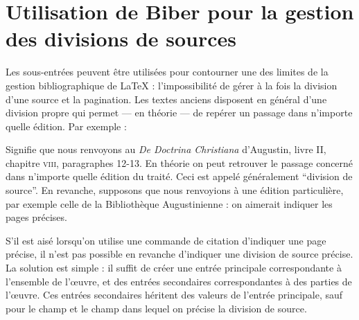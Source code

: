 \section[Division des sources antiques]{Utilisation de Biber pour la gestion des divisions de sources}\label{divisionsource}

Les sous-entrées peuvent être utilisées pour contourner une des limites de la gestion bibliographique de \LaTeX{} : l'impossibilité de gérer à la fois  la division d'une source et la pagination. Les textes anciens disposent en général d'une division propre qui permet --- en théorie ---  de repérer un passage dans n'importe quelle édition. Par exemple :

\begin{quotation}
\cite{DoctrineChretienneDivision}
\end{quotation}

Signifie que nous renvoyons au \emph{De Doctrina Christiana} d'Augustin, livre II, chapitre \textsc{viii}, paragraphes 12-13. En théorie on peut retrouver le passage concerné dans n'importe quelle édition du traité. Ceci est appelé généralement \enquote{division de source}.
En revanche, supposons que nous renvoyions à une édition particulière, par exemple celle de la Bibliothèque Augustinienne : on aimerait indiquer les pages précises.

\begin{quotation}
\cite{DeDoctChrIIviii18-20}
\end{quotation}

S'il est aisé lorsqu'on utilise une commande de citation d'indiquer une page précise, il n'est pas possible en revanche d'indiquer une division de source précise. La solution est  simple : il suffit de créer une entrée principale correspondante à l'ensemble de l'œuvre, et des entrées secondaires correspondantes à des parties de l'œuvre. Ces entrées secondaires héritent des valeurs de l'entrée principale, sauf pour le champ  et le champ  dans lequel on précise la division de source.

